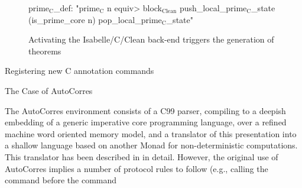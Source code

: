 \begin{isabellebody}
\begin{isamarkuptext}
\begin{figure}
\begin{minipage}{0.45\linewidth}
\begin{isar}
prime$_{\text{C}}$_def: "prime$_{\text{C}}$ n \<equiv>
  block$_{\text{Clean}}$ push_local_prime$_{\text{C}}$_state
             (is_prime_core n)
             pop_local_prime$_{\text{C}}$_state"
\end{isar}
  \end{minipage}
  \caption{Activating the Isabelle/C/Clean back-end triggers the generation of theorems}
  \label{fig:clean}
\end{figure}%
\end{isamarkuptext}\isamarkuptrue%
%
\begin{isamarkupfigure*}%
[label = {C-sample10},type = {Isa_COL.figure}, args={label = {C-sample10},type = {Isa_COL.figure}, Isa_COL.figure.relative_width = {40}, Isa_COL.figure.src = {figures/A-C-Source10}, Isa_COL.figure.spawn_columns = {True}}]Registering new C annotation commands%
\end{isamarkupfigure*}\isamarkuptrue%
%
\begin{isamarkuptext}%
\end{isamarkuptext}\isamarkuptrue%
%
\begin{isamarkupsubsection*}%
[label = {autocorres},type = {scholarly_paper.technical}, args={label = {autocorres},type = {scholarly_paper.technical}, scholarly_paper.text_section.main_author = {@{docitem ''fred''}}, Isa_COL.text_element.level = {}, Isa_COL.text_element.referentiable = {False}, Isa_COL.text_element.variants = {{STR ''outline'', STR ''document''}}, scholarly_paper.text_section.fixme_list = {}, Isa_COL.text_element.level = {}, scholarly_paper.technical.definition_list = {}}]The Case of AutoCorres%
\end{isamarkupsubsection*}\isamarkuptrue%
%
\begin{isamarkuptext}%
The AutoCorres environment consists of a C99 parser, compiling to a deepish embedding
of a generic imperative core programming language, over a refined machine word oriented memory
model, and a translator of this presentation into a shallow language based on another Monad for
non-deterministic computations. This translator has been described in \cite{DBLP:conf/pldi/GreenawayLAK14,DBLP:conf/tphol/WinwoodKSACN09} in detail. However, the
original use of AutoCorres implies a number of protocol rules to follow (e.g., calling the command
 before the command

\end{isamarkuptext}
\end{isabellebody}
